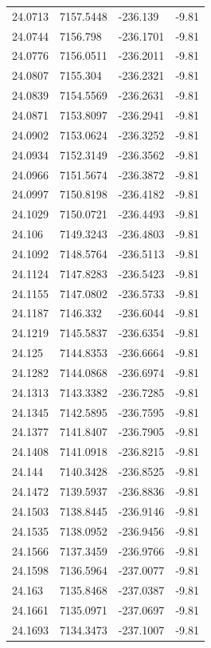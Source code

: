 \begin{table}[H]
\begin{tabular}{llll}
24.0713 & 7157.5448 & -236.139 & -9.81 \\
24.0744 & 7156.798 & -236.1701 & -9.81 \\
24.0776 & 7156.0511 & -236.2011 & -9.81 \\
24.0807 & 7155.304 & -236.2321 & -9.81 \\
24.0839 & 7154.5569 & -236.2631 & -9.81 \\
24.0871 & 7153.8097 & -236.2941 & -9.81 \\
24.0902 & 7153.0624 & -236.3252 & -9.81 \\
24.0934 & 7152.3149 & -236.3562 & -9.81 \\
24.0966 & 7151.5674 & -236.3872 & -9.81 \\
24.0997 & 7150.8198 & -236.4182 & -9.81 \\
24.1029 & 7150.0721 & -236.4493 & -9.81 \\
24.106 & 7149.3243 & -236.4803 & -9.81 \\
24.1092 & 7148.5764 & -236.5113 & -9.81 \\
24.1124 & 7147.8283 & -236.5423 & -9.81 \\
24.1155 & 7147.0802 & -236.5733 & -9.81 \\
24.1187 & 7146.332 & -236.6044 & -9.81 \\
24.1219 & 7145.5837 & -236.6354 & -9.81 \\
24.125 & 7144.8353 & -236.6664 & -9.81 \\
24.1282 & 7144.0868 & -236.6974 & -9.81 \\
24.1313 & 7143.3382 & -236.7285 & -9.81 \\
24.1345 & 7142.5895 & -236.7595 & -9.81 \\
24.1377 & 7141.8407 & -236.7905 & -9.81 \\
24.1408 & 7141.0918 & -236.8215 & -9.81 \\
24.144 & 7140.3428 & -236.8525 & -9.81 \\
24.1472 & 7139.5937 & -236.8836 & -9.81 \\
24.1503 & 7138.8445 & -236.9146 & -9.81 \\
24.1535 & 7138.0952 & -236.9456 & -9.81 \\
24.1566 & 7137.3459 & -236.9766 & -9.81 \\
24.1598 & 7136.5964 & -237.0077 & -9.81 \\
24.163 & 7135.8468 & -237.0387 & -9.81 \\
24.1661 & 7135.0971 & -237.0697 & -9.81 \\
24.1693 & 7134.3473 & -237.1007 & -9.81 \\

\end{tabular}
\end{table}
